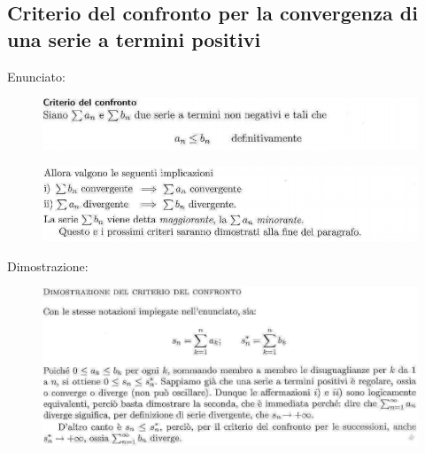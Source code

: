 \documentclass[a4paper, 9pt]{report}
\begin{document}
\subsection*{Criterio del confronto per la convergenza di una serie a termini positivi}
Enunciato:\begin{figure}[h!]
    \includegraphics[width=\linewidth]{../dim/confronto1.PNG}
\end{figure}
\newline\begin{figure}[h!]
    \includegraphics[width=\linewidth]{../dim/confronto2.PNG}
\end{figure}
\newline
Dimostrazione:\begin{figure}[h!]
    \includegraphics[width=\linewidth]{../dim/confronto3.PNG}
\end{figure}
\newpage
\end{document}
